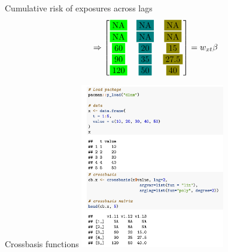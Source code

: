 \documentclass[english]{beamer}
\begin{document}
\begin{frame}{Cumulative risk of exposures across lags}
\[\Rightarrow
\begin{bmatrix}
\fcolorbox{white}{green}{NA} & \fcolorbox{white}{teal}{NA} & \fcolorbox{white}{olive}{NA} \\
\fcolorbox{white}{green}{NA} & \fcolorbox{white}{teal}{NA} & \fcolorbox{white}{olive}{NA} \\
\fcolorbox{white}{green}{60} & \fcolorbox{white}{teal}{20} & \fcolorbox{white}{olive}{15} \\
\fcolorbox{white}{green}{90} & \fcolorbox{white}{teal}{35} & \fcolorbox{white}{olive}{27.5} \\
\fcolorbox{white}{green}{120} & \fcolorbox{white}{teal}{50} & \fcolorbox{white}{olive}{40} \\
\end{bmatrix} = w_{xt}\beta
\]
\end{frame}
\begin{frame}{Crossbasis functions}
    \centering
    \includegraphics[width=6.25cm,keepaspectratio]{images/crossbasis_result.png}
\end{frame}
\end{document}
